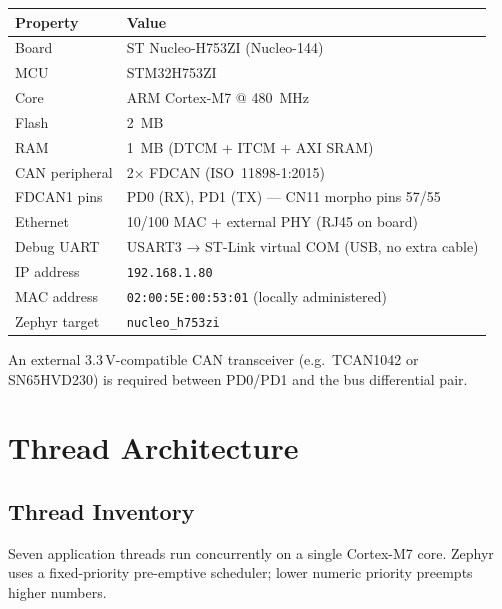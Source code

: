 \documentclass[11pt,a4paper]{article}
\begin{document}
\begin{center}
\begin{tabular}{ll}
\toprule
Property & Value \\
\midrule
Board & ST Nucleo-H753ZI (Nucleo-144) \\
MCU & STM32H753ZI \\
Core & ARM Cortex-M7 @ \SI{480}{MHz} \\
Flash & \SI{2}{MB} \\
RAM & \SI{1}{MB} (DTCM + ITCM + AXI SRAM) \\
CAN peripheral & 2× FDCAN (ISO~11898-1:2015) \\
FDCAN1 pins & PD0 (RX), PD1 (TX) — CN11 morpho pins 57/55 \\
Ethernet & 10/100 MAC + external PHY (RJ45 on board) \\
Debug UART & USART3 → ST-Link virtual COM (USB, no extra cable) \\
IP address & \texttt{192.168.1.80} \\
MAC address & \texttt{02:00:5E:00:53:01} (locally administered) \\
Zephyr target & \texttt{nucleo\_h753zi} \\
\bottomrule
\end{tabular}
\end{center}

An external 3.3\,V-compatible CAN transceiver (e.g.\ TCAN1042 or SN65HVD230)
is required between PD0/PD1 and the bus differential pair.

\section{Thread Architecture}

\subsection{Thread Inventory}

Seven application threads run concurrently on a single Cortex-M7 core. Zephyr
uses a fixed-priority pre-emptive scheduler; lower numeric priority preempts
higher numbers.
\end{document}
